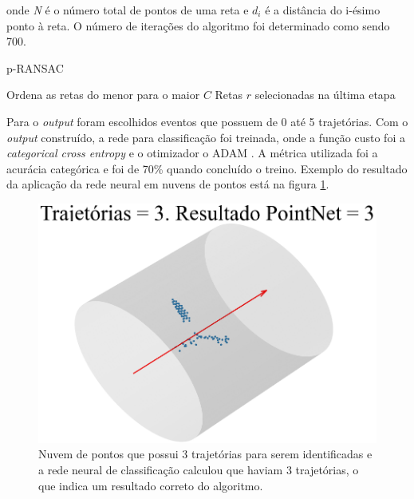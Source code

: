 \documentclass[a4paper,12pt,oneside]{book}
\begin{document}
onde \textit{N} é o número total de pontos de uma reta e $d_i$ é a distância do i-ésimo ponto à reta. O número de iterações do algoritmo foi determinado como sendo 700.

\begin{algorithm}[H]
    \caption{p-RANSAC}\label{ransac_algo}
    Ordena as retas do menor para o maior $C$\;
    \Return Retas $r$ selecionadas na última etapa\;
\end{algorithm}

\par Para o \textit{output} foram escolhidos eventos que possuem de 0 até 5 trajetórias. Com o \textit{output} construído, a rede para classificação foi treinada, onde a função custo foi a \textit{categorical cross entropy} \cite{MSE_CEF_review} e o otimizador o ADAM \cite{ADAMAX}. A métrica utilizada foi a acurácia categórica e foi de 70\% quando concluído o treino. Exemplo do resultado da aplicação da rede neural em nuvens de pontos está na figura \ref{fig:pointnet_class_exs}.

\begin{figure}[H]
    \centering
    \includegraphics[scale = 0.5]{figs/ex1_pointnet_class.png}
    \caption{Nuvem de pontos que possui 3 trajetórias para serem identificadas e a rede neural de classificação calculou que haviam 3 trajetórias, o que indica um resultado correto do algoritmo.}
    \label{fig:pointnet_class_exs}
\end{figure}
\end{document}
